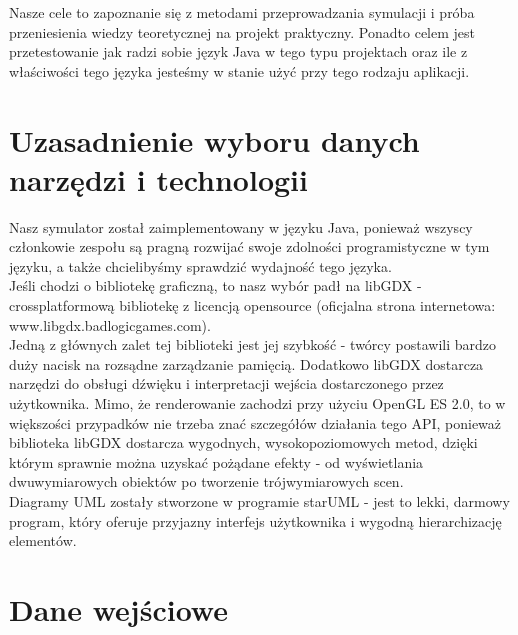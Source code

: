 \documentclass[a4paper, 11pt]{article}
\begin{document}
	Nasze cele to zapoznanie się z metodami przeprowadzania symulacji i próba przeniesienia wiedzy teoretycznej na projekt praktyczny. Ponadto celem jest przetestowanie jak radzi sobie język Java w tego typu projektach oraz ile z właściwości tego języka jesteśmy w stanie użyć przy tego rodzaju aplikacji.
	
	\section*{Uzasadnienie wyboru danych narzędzi i technologii}
	\indent
	
	Nasz symulator został zaimplementowany w języku Java, ponieważ wszyscy członkowie zespołu są pragną rozwijać swoje zdolności programistyczne w tym języku, a także chcielibyśmy sprawdzić wydajność tego języka.\\
	
	Jeśli chodzi o bibliotekę graficzną, to nasz wybór padł na libGDX - crossplatformową bibliotekę z licencją opensource (oficjalna strona internetowa: www.libgdx.badlogicgames.com). \\
	
	Jedną z głównych zalet tej biblioteki jest jej szybkość - twórcy postawili bardzo duży nacisk na rozsądne zarządzanie pamięcią.  Dodatkowo libGDX dostarcza narzędzi do obsługi dźwięku i interpretacji wejścia dostarczonego przez użytkownika. Mimo, że renderowanie zachodzi przy użyciu OpenGL ES 2.0, to w większości przypadków nie trzeba znać szczegółów działania tego API, ponieważ biblioteka libGDX dostarcza wygodnych, wysokopoziomowych metod, dzięki którym sprawnie można uzyskać pożądane efekty - od wyświetlania dwuwymiarowych obiektów po tworzenie trójwymiarowych scen.\\
	
	Diagramy UML zostały stworzone w programie starUML - jest to lekki, darmowy program, który oferuje przyjazny interfejs użytkownika i wygodną hierarchizację elementów.
	
	
	\section*{Dane wejściowe}
	\indent
	
\end{document}
